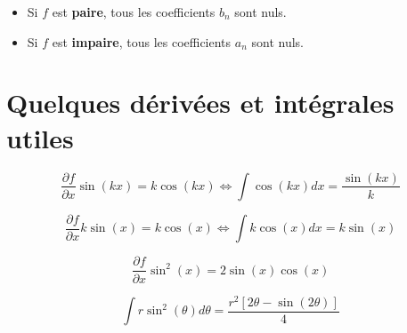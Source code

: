 \documentclass{article}
\begin{document}
\begin{itemize}
    \item Si $f$ est \textbf{paire}, tous les coefficients $b_n$ sont nuls.
    \item Si $f$ est \textbf{impaire}, tous les coefficients $a_n$ sont nuls.
\end{itemize}

\section{Quelques dérivées et intégrales utiles}
\begin{equation}
    \frac{\partial f}{\partial x} \sin(kx) = k \cos(kx) 
    \Leftrightarrow 
    \int \cos(kx) dx = \frac{\sin(kx)}{k}
\end{equation}

\begin{equation}
    \frac{\partial f}{\partial x} k \sin(x) = k \cos(x) 
    \Leftrightarrow 
    \int k \cos(x) dx = k \sin(x)
\end{equation}

\begin{equation}
    \frac{\partial f}{\partial x} \sin^2(x) = 2\sin(x)\cos(x) 
\end{equation}

\begin{equation}
    \int r \sin^2(\theta) d\theta = \frac{r^2[2\theta - \sin(2\theta)]}{4}
\end{equation}
\end{document}
